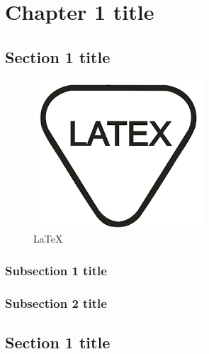 \chapter{Chapter 1 title}

\section{Section 1 title} 
\blindtext\cite{hagmann2007cosmic,mewaldt1996cosmic} 
\begin{figure}[h]
	\centering 
	\includegraphics[scale=1]{../figure/1.png}
    \caption{\LaTeX}
\end{figure}
\subsection{Subsection 1 title}
\blindtext\cite{wright2006monte,hagmann2007cosmic}
\subsection{Subsection 2 title}
\blindtext
\section{Section 1 title} 
\blindtext































































